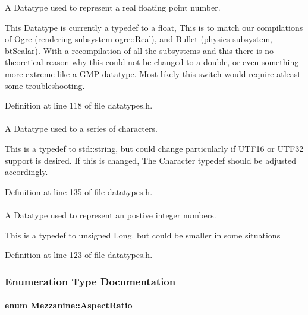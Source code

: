 A Datatype used to represent a real floating point number. 

This Datatype is currently a typedef to a float, This is to match our compilations of Ogre (rendering subsystem ogre::Real), and Bullet (physics subsystem, btScalar). With a recompilation of all the subsystems and this there is no theoretical reason why this could not be changed to a double, or even something more extreme like a GMP datatype. Most likely this switch would require atleast some troubleshooting. 

Definition at line 118 of file datatypes.h.

\hypertarget{namespaceMezzanine_acf9fcc130e6ebf08e3d8491aebcf1c86}{
\paragraph[{String}]{}\hfill}
\label{namespaceMezzanine_acf9fcc130e6ebf08e3d8491aebcf1c86}


A Datatype used to a series of characters. 

This is a typedef to std::string, but could change particularly if UTF16 or UTF32 support is desired. If this is changed, The Character typedef should be adjusted accordingly. 

Definition at line 135 of file datatypes.h.

\hypertarget{namespaceMezzanine_adcbb6ce6d1eb4379d109e51171e2e493}{
\paragraph[{Whole}]{}\hfill}
\label{namespaceMezzanine_adcbb6ce6d1eb4379d109e51171e2e493}


A Datatype used to represent an postive integer numbers. 

This is a typedef to unsigned Long. but could be smaller in some situations 

Definition at line 123 of file datatypes.h.



\subsubsection{Enumeration Type Documentation}
\hypertarget{namespaceMezzanine_a4f14cccd98d1bdc1bf934c1c028e3eaf}{
\paragraph[{AspectRatio}]{\setlength{\rightskip}{0pt plus 5cm}enum {\bf Mezzanine::AspectRatio}}\hfill}
\label{namespaceMezzanine_a4f14cccd98d1bdc1bf934c1c028e3eaf}


